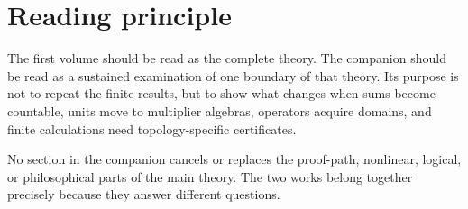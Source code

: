 \documentclass[11pt]{article}
\begin{document}
\section*{Reading principle}
The first volume should be read as the complete theory.  The companion should be read as a sustained examination of one boundary of that theory.  Its purpose is not to repeat the finite results, but to show what changes when sums become countable, units move to multiplier algebras, operators acquire domains, and finite calculations need topology-specific certificates.

No section in the companion cancels or replaces the proof-path, nonlinear, logical, or philosophical parts of the main theory.  The two works belong together precisely because they answer different questions.
\end{document}
